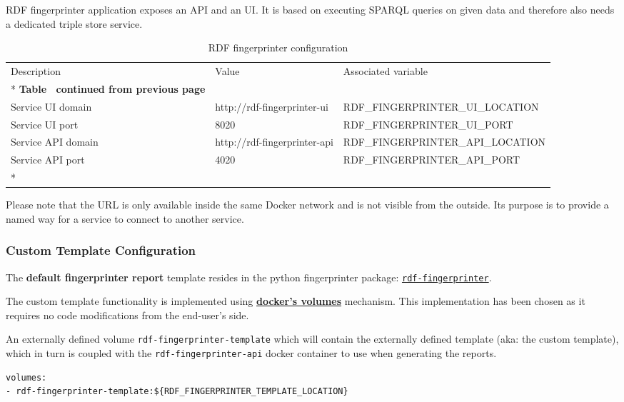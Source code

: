 	RDF fingerprinter application exposes an API and an UI. It is based on executing SPARQL queries on given data and therefore also needs a dedicated triple store service. 

	\begin{longtable}[c]{@{}p{3.8cm}p{3cm}l@{}}
		\toprule
		Description & Value & Associated variable \\* \midrule
		\endfirsthead
		\multicolumn{3}{c}%
		{{\bfseries Table \thetable\ continued from previous page}} \\
		\endhead
		\bottomrule
		\endfoot
		\endlastfoot
		Service UI domain & http://rdf-fingerprinter-ui & RDF\_FINGERPRINTER\_UI\_LOCATION \\
		Service UI port & 8020 & RDF\_FINGERPRINTER\_UI\_PORT \\
		Service API domain & http://rdf-fingerprinter-api & RDF\_FINGERPRINTER\_API\_LOCATION \\
		Service API port & 4020 & RDF\_FINGERPRINTER\_API\_PORT \\* \bottomrule
		\caption{RDF fingerprinter configuration}
		\label{tab:my-table7}\\
	\end{longtable}

	Please note that the URL is only available inside the same Docker network and is not visible from the outside. Its purpose is to provide a named way for a service to connect to another service.
	
	\subsubsection{Custom Template Configuration}
		The \textbf{default fingerprinter report} template resides in the python fingerprinter package: \href{https://github.com/meaningfy-ws/rdf-fingerprinter/tree/master/fingerprint_report_templates/fingerprint_report}{\texttt{rdf-fingerprinter}}.

		The custom template functionality is implemented using \textbf{\href{https://docs.docker.com/storage/volumes/}{docker's volumes}} mechanism. This implementation has been chosen as it requires no code modifications from the end-user's side.

		An externally defined volume \texttt{rdf-fingerprinter-template} which will contain the externally defined template (aka: the custom template), which in turn is coupled with the \texttt{rdf-fingerprinter-api} docker container to use when generating the reports.
		\begin{lstlisting}[]
volumes:
- rdf-fingerprinter-template:${RDF_FINGERPRINTER_TEMPLATE_LOCATION}
		\end{lstlisting}

